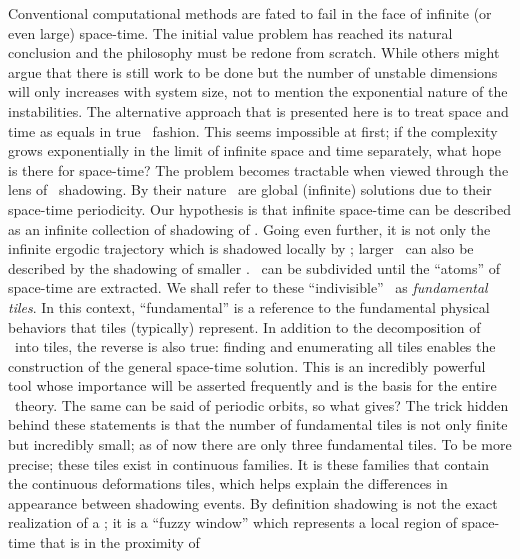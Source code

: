
Conventional computational methods
are fated to fail in the face of
infinite (or even large) space-time. The initial value
problem has reached its natural conclusion and
the philosophy must be redone from scratch. While
others might argue that there is still work to be done
but the number of unstable dimensions will only increases with
system size, not to mention the exponential nature of
the instabilities. The alternative approach that
is presented here is to treat space and time as equals
in true \spt\ fashion. This seems impossible at first;
if the complexity grows exponentially in the limit of
infinite space and time separately, what hope is there
for space-time? The problem becomes tractable when viewed
through the lens of \spt\ shadowing.
By their nature
\twots\ are global (infinite) solutions due to their space-time periodicity.
Our hypothesis is that infinite space-time can be described
as an infinite collection of shadowing of \twots. Going even further, it is
not only the infinite ergodic trajectory which is shadowed locally by \twots;
larger \twots\ can also be described by the shadowing of smaller \twots. \twoTs\
can be subdivided until the ``atoms'' of space-time are extracted.
We shall refer to these ``indivisible'' \twots\ as \textit{fundamental tiles}.
In this context, ``fundamental'' is a reference to the fundamental physical
behaviors that tiles (typically) represent. In addition to the decomposition
of \twots\ into tiles, the reverse is also true:
finding and enumerating all tiles enables the construction
of the general space-time solution.
This is an incredibly powerful
tool whose importance will be asserted frequently and is the basis for the
entire \spt\ theory. The same can be said of periodic orbits, so what gives?
The trick hidden behind these statements is that the number of fundamental
tiles is not only finite but incredibly small; as of now there are only three
fundamental tiles. To be more precise; these tiles exist in
continuous families. It is these families that contain
the continuous deformations tiles, which helps explain the differences
in appearance between shadowing events.
By definition shadowing is not the exact realization of a \twot; it is a ``fuzzy window'' which
represents a local region of space-time that is in the proximity of
